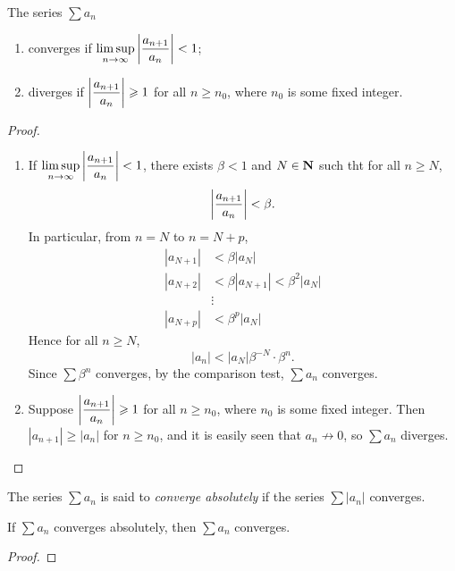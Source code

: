 \begin{lemma}\label{lemma:ratio-test}
The series $\sum a_n$
\begin{enumerate}[label=(\roman*)]
\item converges if $\displaystyle\limsup_{n\to\infty}\left|\frac{a_{n+1}}{a_n}\right|<1$;
\item diverges if $\displaystyle\left|\frac{a_{n+1}}{a_n}\right|\geqslant1$ for all $n\ge n_0$, where $n_0$ is some fixed integer.
\end{enumerate}
\end{lemma}

\begin{proof} \
\begin{enumerate}[label=(\roman*)]
\item If $\displaystyle\limsup_{n\to\infty}\left|\frac{a_{n+1}}{a_n}\right|<1$, there exists $\beta<1$ and $N\in\mathbf N$ such tht for all $n\ge N$,
\[\left|\frac{a_{n+1}}{a_n}\right|<\beta.\]
In particular, from $n=N$ to $n=N+p$,
\begin{align*}
|a_{N+1}|&<\beta|a_N|\\
|a_{N+2}|&<\beta|a_{N+1}|<\beta^2|a_N|\\
&\vdots\\
|a_{N+p}|&<\beta^p|a_N|
\end{align*}
Hence for all $n\ge N$,
\[|a_n|<|a_N|\beta^{-N}\cdot\beta^n.\]
Since $\sum\beta^n$ converges, by the comparison test, $\sum a_n$ converges.
\item Suppose $\displaystyle\left|\frac{a_{n+1}}{a_n}\right|\geqslant1$ for all $n\ge n_0$, where $n_0$ is some fixed integer. Then $|a_{n+1}|\ge|a_n|$ for $n\ge n_0$, and it is easily seen that $a_n\not\to0$, so $\sum a_n$ diverges.
\end{enumerate}
\end{proof}

The series $\sum a_n$ is said to \emph{converge absolutely} if the series $\sum|a_n|$ converges.

\begin{lemma}\label{lemma:absolute-convergence}
If $\sum a_n$ converges absolutely, then $\sum a_n$ converges.
\end{lemma}

\begin{proof}

\end{proof}

